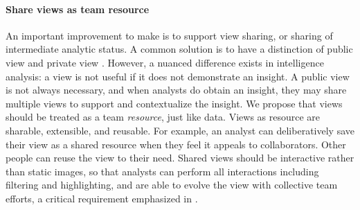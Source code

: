 \paragraph{Share views as team resource}

An important improvement to make is to support view sharing, or
sharing of intermediate analytic status. A common solution is to have a
distinction of public view and private view \cite{Convertino2011,Greenberg1990}. However, a nuanced difference exists in intelligence analysis: a view is not useful if it does not demonstrate an insight. A public view is not always necessary, and when analysts do obtain an insight, they may share multiple views to support and contextualize the insight.
We propose that views should be treated as a team
\emph{resource}, just like data. Views as resource are sharable,
extensible, and reusable. For example, an analyst can deliberatively save their view as a shared resource when
they feel it appeals to collaborators. Other people can reuse the view
to their need. Shared views should be interactive rather than static
images, so that analysts can perform all interactions including
filtering and highlighting, and are able to evolve the view with
collective team efforts, a critical requirement emphasized in
\cite{Carroll2013}.

